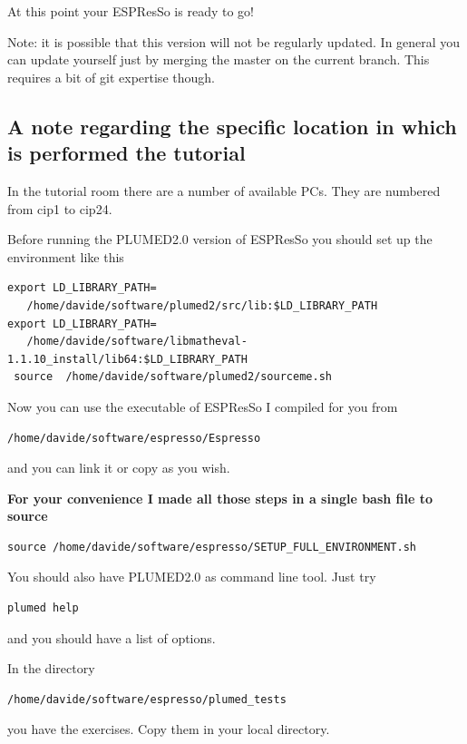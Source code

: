\documentclass[10pt,fleqn,a4paper]{report}
\begin{document}
At this point your ESPResSo is ready to go!

Note: it is possible that this version will not be regularly updated.
In general you can update yourself just by merging the master on the current branch. 
This requires a bit of git expertise though. 

\subsection{A note regarding the specific location in which is performed the tutorial}

In the tutorial room there are a number of available PCs. They are numbered from cip1 to cip24.

Before running the PLUMED2.0 version of ESPResSo you should set up the environment like this
\begin{verbatim}
export LD_LIBRARY_PATH=
   /home/davide/software/plumed2/src/lib:$LD_LIBRARY_PATH
export LD_LIBRARY_PATH=
   /home/davide/software/libmatheval-1.1.10_install/lib64:$LD_LIBRARY_PATH
 source  /home/davide/software/plumed2/sourceme.sh 
\end{verbatim}

Now you can use the executable of ESPResSo I compiled for you from 
\begin{verbatim}
/home/davide/software/espresso/Espresso
\end{verbatim}
and you can link it or copy as you wish.

{\bf For your convenience I made all those steps in a single bash file to source}
\begin{verbatim}
source /home/davide/software/espresso/SETUP_FULL_ENVIRONMENT.sh
\end{verbatim}

You should also have PLUMED2.0 as command line tool.
Just try
\begin{verbatim}
plumed help
\end{verbatim}
and you should have a list of options.

In the directory
\begin{verbatim}
/home/davide/software/espresso/plumed_tests
\end{verbatim}

you have the exercises. Copy them in your local directory.
\end{document}
